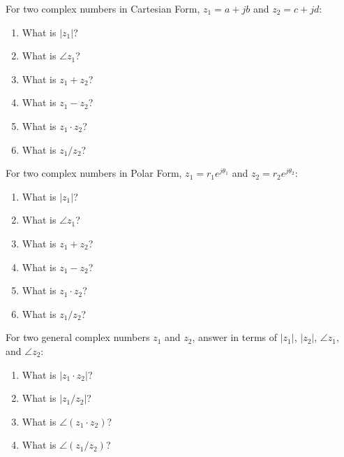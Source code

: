 

\begin{enumerate}
\qitem For two complex numbers in Cartesian Form, $z_1 = a + jb$ and $z_2 = c + jd$:
\begin{enumerate}
\item What is $|z_1|$?
\item What is $\angle z_1$?
\item What is $z_1 + z_2$? 
\item What is $z_1 - z_2$? 
\item What is $z_1 \cdot z_2$? 
\item What is $z_1 / z_2$? 
\end{enumerate}

\sol{
\[ |z_1| = \sqrt{a^2 + b^2} \]
\[ \angle z_1 = \arctan(b/a) \]
\[z_1 + z_2 = (a + c) + j(b + d)\]
\[z_1 - z_2 = (a - c) + j(b - d)\]
\[z_1 * z_2 = (ac - bd) + j(ad + bc)\]
\[\frac{z_1}{z_2} = \frac{(ac + bd) + j(bc - ad)}{c^2 + d^2}\]
}

\qitem For two complex numbers in Polar Form, $z_1 = r_1e^{j\theta_1}$ and $z_2 = r_2e^{j\theta_2}$: 
\begin{enumerate}
\item What is $|z_1|$?
\item What is $\angle z_1$?
\item What is $z_1 + z_2$? 
\item What is $z_1 - z_2$? 
\item What is $z_1 \cdot z_2$? 
\item What is $z_1 / z_2$? 
\end{enumerate}

\sol{
\[ |z_1| = r_1 \]
\[ \angle z_1 = \theta_1 \]
\[z_1 + z_2 = \left( r_1\cos\theta_1 + r_2\cos\theta_2 \right) + j\left( r_1\sin\theta_1 + r_2\sin\theta_2 \right)\]
\[z_1 - z_2 = \left( r_1\cos\theta_1 - r_2\cos\theta_2 \right) + j\left( r_1\sin\theta_1 - r_2\sin\theta_2 \right)\]
\[z_1 \cdot z_2 = r_1r_2\,e^{j(\theta_1 + \theta_2)} \]
\[\frac{z_1}{z_2} = \frac{r_1}{r_2}\,e^{j(\theta_1 - \theta_2)} \]
}

\qitem For two general complex numbers $z_1$ and $z_2$, answer in terms of $|z_1|$, $|z_2|$, $\angle z_1$, and $\angle z_2$:
\begin{enumerate}
\item What is $|z_1 \cdot z_2|$?
\item What is $|z_1 / z_2|$?
\item What is $\angle (z_1 \cdot z_2)$?
\item What is $\angle (z_1 / z_2)$?
\end{enumerate}

\sol{
\[ |z_1 \cdot z_2| = |z_1||z_2| \]
\[ |z_1 / z_2| = |z_1| / |z_2| \]
\[ \angle (z_1 \cdot z_2) = \angle z_1 + \angle z_2 \]
\[ \angle (z_1 / z_2) = \angle z_1 - \angle z_2 \]
}

\end{enumerate}
